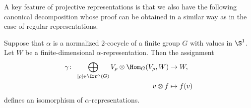 A key feature of projective representations is that we also have the following canonical
decomposition whose proof can be obtained in a similar way as in the case of regular
representations.

\begin{Th}\label{can,decom}
Suppose that $\alpha$ is a
normalized $2$-cocycle of a finite group $G$ with values in $\S^{1}$. Let $W$ be a
finite-dimensional $\alpha$-representation. Then the assignment
\begin{align*}
\gamma\colon\ \bigoplus_{[\rho]\in \Irr^{\alpha}(G)}V_{\rho}\otimes \Hom_{G}(V_{\rho},W)
&\rightarrow W,
\\
v\otimes f&\mapsto f(v)
\end{align*}
defines an isomorphism of $\alpha$-representations.
\end{Th}

